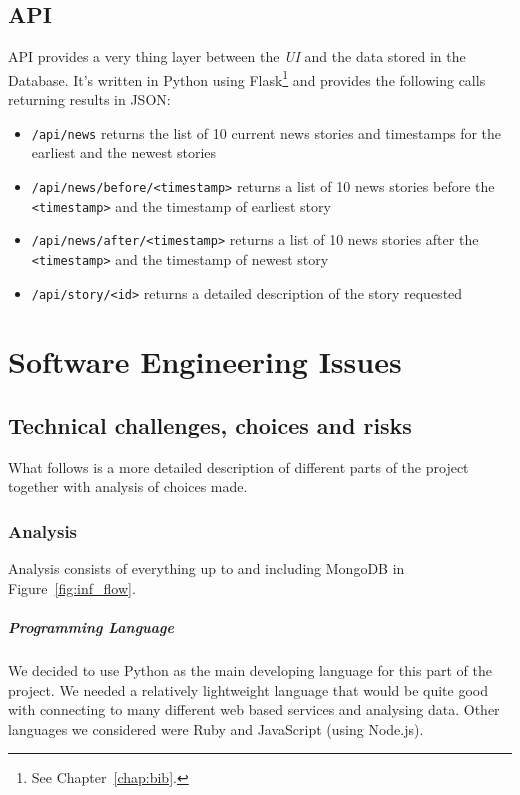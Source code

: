 \documentclass{report}
\begin{document}
		\section{API}
		API provides a very thing layer between the \emph{UI} and the data stored in the Database. It's written in Python using Flask\footnote{See Chapter~\ref{chap:bib}.} and provides the following calls returning results in JSON:
		\begin{itemize}
		  \item \verb|/api/news| returns the list of 10 current news stories and timestamps for the earliest and the newest stories
		  \item \verb|/api/news/before/<timestamp>| returns a list of 10 news stories before the \verb|<timestamp>| and the timestamp of earliest story
		  \item \verb|/api/news/after/<timestamp>| returns a list of 10 news stories after the \verb|<timestamp>| and the timestamp of newest story
		  \item \verb|/api/story/<id>| returns a detailed description of the story requested
		\end{itemize}
		
		
	\chapter{Software Engineering Issues}
	
	\section{Technical challenges, choices and risks}
	What follows is a more detailed description of different parts of the project together with analysis of choices made.
	
	\subsection{Analysis}
		Analysis consists of everything up to and including MongoDB in Figure~\ref{fig:inf_flow}.
		
		\paragraph{Programming Language} We decided to use Python as the main developing language for this part of the project. We needed a relatively lightweight language that would be quite good with connecting to many different web based services and analysing data. Other languages we considered were Ruby and JavaScript (using Node.js).
		
\end{document}
